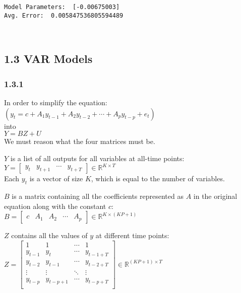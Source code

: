 \documentclass[11pt]{article}
\begin{document}
    \begin{Verbatim}[commandchars=\\\{\}]
Model Parameters:  [-0.00675003]
Avg. Error:  0.005847536805594489
    \end{Verbatim}

    \begin{center}
    \end{center}
    { \hspace*{\fill} \\}
    
    \hypertarget{var-models}{%
\subsection{1.3 VAR Models}\label{var-models}}

\hypertarget{section}{%
\subsubsection{1.3.1}\label{section}}

In order to simplify the equation:\\
$(y_t = c + A_1y_{t-1} + A_2y_{t−2} + \cdots + A_py_{t−p} + e_t)$ \\
into\\
\(Y = BZ + U\)\\
We must reason what the four matrices must be.

\(Y\) is a list of all outputs for all variables at all-time points:\\
\(Y = \begin{bmatrix} y_t & y_{t+1} & \cdots & y_{t+T} \end{bmatrix} \in \mathbb{R}^{K\times T}\)\\
Each \(y_t\) is a vector of size \(K\), which is equal to the number of
variables.

\(B\) is a matrix containing all the coefficients represented as
\(A\) in the original equation along with the constant \(c\):\\
\(B = \begin{bmatrix} c & A_1 & A_2 & \cdots & A_p \end{bmatrix} \in \mathbb{R}^{K \times (KP + 1)}\)

\(Z\) contains all the values of \(y\) at different time points:\\
\(Z = \begin{bmatrix}  1 & 1 & \cdots & 1 \\  y_{t-1} & y_{t} & \cdots & y_{t-1+T} \\  y_{t-2} & y_{t-1} & \cdots & y_{t-2+T} \\  \vdots & \vdots & \ddots & \vdots \\  y_{t-p} & y_{t-p+1} & \cdots & y_{t-p+T} \\ \end{bmatrix} \in \mathbb{R}^{(KP + 1) \times T}\)
\end{document}
